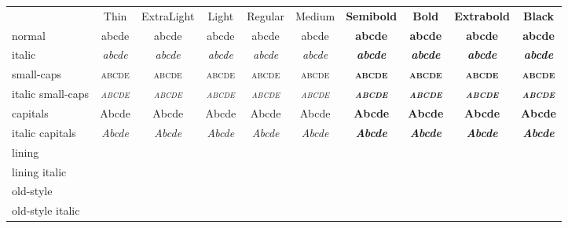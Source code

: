 \documentclass[11pt,a4paper]{article}
\newcommand*\spA{abcde}
\newcommand*\spB{01469}
\newcommand*\spr[1][\spA]{& #1 & #1 & #1 & #1 & #1 & #1 & #1 & #1 & #1\\}
\begin{document}
\centering
\begin{tabular}{
		>{}l
		>{\ralewaythin}c
		>{\ralewayextra}c
		>{\ralewaylight}c
		>{\raleway}c
		>{\ralewaymedium}c
		>{\ralewaylight\bfseries}c
		>{\raleway\bfseries}c
		>{\ralewayextra\bfseries}c
		>{\ralewaythin\bfseries}c }
	& Thin & ExtraLight & Light & Regular & Medium & Semibold & Bold & Extrabold & Black \\
	normal               \spr
	italic               \spr[\itshape\spA]
	small-caps           \spr[\scshape\spA]
	italic small-caps    \spr[\scshape\itshape\spA]
	capitals             \spr[\MakeUppercase\spA]
	italic capitals      \spr[\itshape\MakeUppercase\spA]
	lining               \spr[\liningnums{\spB}]
	lining italic        \spr[\liningnums{\itshape\spB}]
	old-style            \spr[\oldstylenums{\spB}]
	old-style italic     \spr[\oldstylenums{\itshape\spB}]
\end{tabular}
\end{document}
